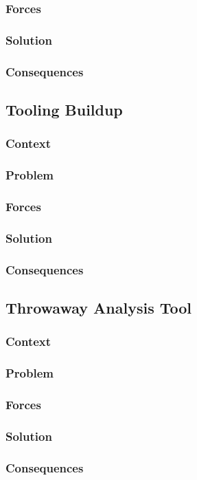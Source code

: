 \documentclass[sigconf]{acmart}
\begin{document}
\subsubsection*{Forces}
\subsubsection*{Solution}
\subsubsection*{Consequences}


\subsection{Tooling Buildup}
\subsubsection*{Context}
\subsubsection*{Problem}
\subsubsection*{Forces}
\subsubsection*{Solution}
\subsubsection*{Consequences}




\subsection{Throwaway Analysis Tool}
\subsubsection*{Context}
\subsubsection*{Problem}
\subsubsection*{Forces}
\subsubsection*{Solution}
\subsubsection*{Consequences}






\end{document}
